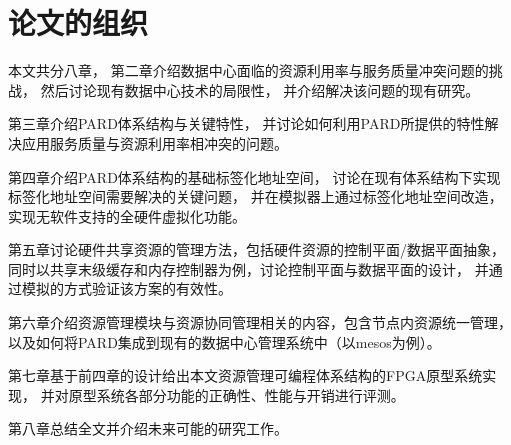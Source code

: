 \section{论文的组织}

本文共分八章，
第二章介绍数据中心面临的资源利用率与服务质量冲突问题的挑战，
然后讨论现有数据中心技术的局限性，
并介绍解决该问题的现有研究。

第三章介绍PARD体系结构与关键特性，
并讨论如何利用PARD所提供的特性解决应用服务质量与资源利用率相冲突的问题。

第四章介绍PARD体系结构的基础标签化地址空间，
讨论在现有体系结构下实现标签化地址空间需要解决的关键问题，
并在模拟器上通过标签化地址空间改造，实现无软件支持的全硬件虚拟化功能。

第五章讨论硬件共享资源的管理方法，包括硬件资源的控制平面/数据平面抽象，
同时以共享末级缓存和内存控制器为例，讨论控制平面与数据平面的设计，
并通过模拟的方式验证该方案的有效性。

第六章介绍资源管理模块与资源协同管理相关的内容，包含节点内资源统一管理，
以及如何将PARD集成到现有的数据中心管理系统中（以mesos\cite{Hindman:2011:Mesos}为例）。

第七章基于前四章的设计给出本文资源管理可编程体系结构的FPGA原型系统实现，
并对原型系统各部分功能的正确性、性能与开销进行评测。

第八章总结全文并介绍未来可能的研究工作。


